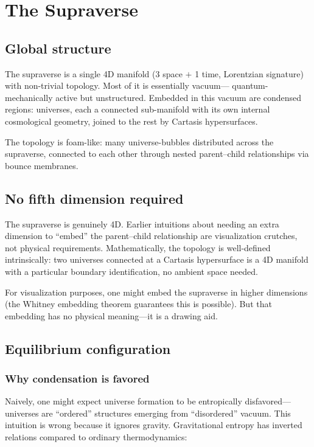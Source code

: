 \chapter{The Supraverse}
\label{chap:supraverse}

\section{Global structure}

The supraverse is a single 4D manifold (3 space $+$ 1 time, Lorentzian
signature) with non-trivial topology. Most of it is essentially vacuum---
quantum-mechanically active but unstructured. Embedded in this vacuum are
condensed regions: universes, each a connected sub-manifold with its own
internal cosmological geometry, joined to the rest by Cartasis hypersurfaces.

The topology is foam-like: many universe-bubbles distributed across the
supraverse, connected to each other through nested parent--child relationships
via bounce membranes.

\section{No fifth dimension required}

The supraverse is genuinely 4D. Earlier intuitions about needing an extra
dimension to ``embed'' the parent--child relationship are visualization
crutches, not physical requirements. Mathematically, the topology is well-defined
intrinsically: two universes connected at a Cartasis hypersurface is a 4D
manifold with a particular boundary identification, no ambient space needed.

For visualization purposes, one might embed the supraverse in higher dimensions
(the Whitney embedding theorem guarantees this is possible). But that embedding
has no physical meaning---it is a drawing aid.

\section{Equilibrium configuration}

\subsection{Why condensation is favored}

Naively, one might expect universe formation to be entropically disfavored---
universes are ``ordered'' structures emerging from ``disordered'' vacuum. This
intuition is wrong because it ignores gravity. Gravitational entropy has
inverted relations compared to ordinary thermodynamics:


